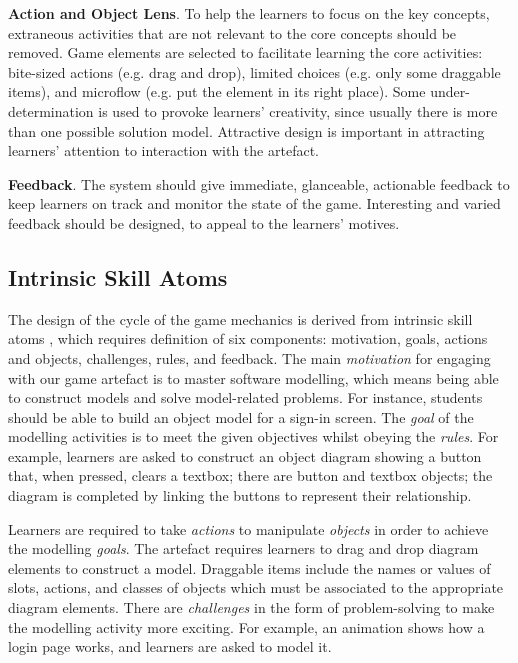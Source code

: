 \documentclass[runningheads,a4paper]{llncs}
\begin{document}
\textbf{Action and Object Lens}. To help the learners to focus on the key concepts, extraneous activities that are not relevant to the core concepts should be removed.  Game elements are selected to facilitate learning the core activities: bite-sized actions (e.g. drag and drop), limited choices (e.g. only some draggable items), and microflow (e.g. put the  element in its right place). Some under-determination is used to provoke learners' creativity, since usually there is more than one possible solution model. Attractive design is  important in attracting learners' attention to interaction with the artefact.

\textbf{Feedback}. The system should give immediate, glanceable, actionable feedback to keep learners on track and monitor the state of the game. Interesting and varied feedback should be designed, to appeal to the learners' motives. 

\subsection{Intrinsic Skill Atoms}
The design of the cycle of the game mechanics is derived from intrinsic skill atoms \cite{deterding2015lens}, which requires definition of six components: motivation, goals, actions and objects, challenges, rules, and feedback. The main \emph{motivation} for engaging with our game artefact is to master software modelling, which means being able to construct models and solve model-related problems. For instance, students should be able to build an object model for a sign-in screen. The \emph{goal} of the modelling activities is to meet the given objectives whilst obeying the \emph{rules}. For example, learners are asked to construct an object diagram showing a button that, when pressed, clears a textbox; there are button  and textbox objects; the diagram is completed by linking the buttons  to represent their relationship. 

Learners are required to take  \emph{actions} to manipulate  \emph{objects} in order to achieve the modelling \emph{goals}. The artefact requires learners to  drag and  drop diagram elements to construct a model.  Draggable items include the names or values of slots, actions, and classes of objects which must be associated to the appropriate diagram elements. There are    \emph{challenges} in the form of problem-solving  to make the modelling activity more exciting. For example, an animation  shows how a login page works, and learners are asked to model it. 
\end{document}
